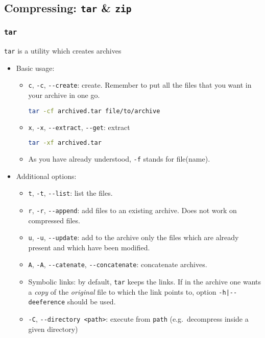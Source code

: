 \documentclass[a4paper,12pt,%
              final%
              ]{article}
\begin{document}
\subsection{Compressing: \texttt{tar} \& \texttt{zip}}
\subsubsection{\texttt{tar}}
\texttt{tar} is a utility which creates archives
\begin{itemize}
  \item Basic usage:
    \begin{itemize}
      \item \verb|c|, \verb|-c|, \verb|--create|: create. Remember to put all the files that you want in your archive in one go.
\begin{lstlisting}[language=bash]
tar -cf archived.tar file/to/archive
\end{lstlisting}
      \item \verb|x|, \verb|-x|, \verb|--extract|, \verb|--get|: extract
\begin{lstlisting}[language=bash]
tar -xf archived.tar
\end{lstlisting}
      \item As you have already understood, \verb|-f| stands for file(name).
    \end{itemize}
  \item Additional options:
    \begin{itemize}
      \item \verb|t|, \verb|-t|, \verb|--list|: list the files.
      \item \verb|r|, \verb|-r|, \verb|--append|: add files to an existing archive. Does not work on compressed files.
      \item \verb|u|, \verb|-u|, \verb|--update|: add to the archive only the files which are already present and which have been modified.
      \item \verb|A|, \verb|-A|, \verb|--catenate|, \verb|--concatenate|: concatenate archives.
      \item Symbolic links: by default, \texttt{tar} keeps the links. If in the archive one wants a \emph{copy} of the \emph{original} file to which the link points to, option \verb!-h|--deeference! should be used.
      \item \verb|-C|, \verb|--directory <path>|: execute from \verb|path| (e.g.\ decompress inside a given directory)

\end{itemize}
\end{itemize}
\end{document}
